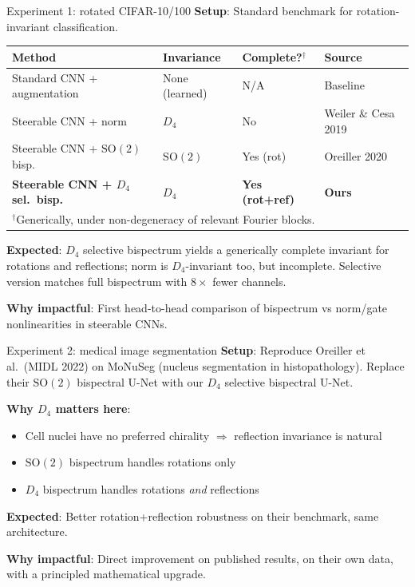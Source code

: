 \documentclass[aspectratio=169]{beamer}
\newcommand{\SO}{\mathrm{SO}}
\begin{document}
\begin{frame}{Experiment 1: rotated CIFAR-10/100}\small
  \textbf{Setup}: Standard benchmark for rotation-invariant classification.

  \medskip

  \begin{center}\scriptsize
  \begin{tabular}{llll}
    \toprule
    \textbf{Method} & \textbf{Invariance} & \textbf{Complete?}$^\dagger$ & \textbf{Source} \\
    \midrule
    Standard CNN + augmentation & None (learned) & N/A & Baseline \\
    Steerable CNN + norm & $D_4$ & No & Weiler \& Cesa 2019 \\
    Steerable CNN + $\SO(2)$ bisp. & $\SO(2)$ & Yes (rot) & Oreiller 2020 \\
    \textbf{Steerable CNN + $D_4$ sel.\ bisp.} & \textbf{$D_4$} & \textbf{Yes (rot+ref)} & \textbf{Ours} \\
    \multicolumn{4}{l}{\tiny $^\dagger$Generically, under non-degeneracy of relevant Fourier blocks.} \\
    \bottomrule
  \end{tabular}
  \end{center}

  \medskip

  \textbf{Expected}: $D_4$ selective bispectrum yields a generically complete invariant for rotations and reflections; norm is $D_4$-invariant too, but incomplete. Selective version matches full bispectrum with $8\times$ fewer channels.

  \medskip

  \textbf{Why impactful}: First head-to-head comparison of bispectrum vs norm/gate nonlinearities in steerable CNNs.
\end{frame}

\begin{frame}{Experiment 2: medical image segmentation}\small
  \textbf{Setup}: Reproduce Oreiller et al.\ (MIDL 2022) on MoNuSeg (nucleus segmentation in histopathology). Replace their $\SO(2)$ bispectral U-Net with our $D_4$ selective bispectral U-Net.

  \medskip

  \textbf{Why $D_4$ matters here}:
  \begin{itemize}\setlength{\itemsep}{1pt}
    \item Cell nuclei have no preferred chirality $\Rightarrow$ reflection invariance is natural
    \item $\SO(2)$ bispectrum handles rotations only
    \item $D_4$ bispectrum handles rotations \textit{and} reflections
  \end{itemize}

  \medskip

  \textbf{Expected}: Better rotation+reflection robustness on their benchmark, same architecture.

  \medskip

  \textbf{Why impactful}: Direct improvement on published results, on their own data, with a principled mathematical upgrade.
\end{frame}
\end{document}
